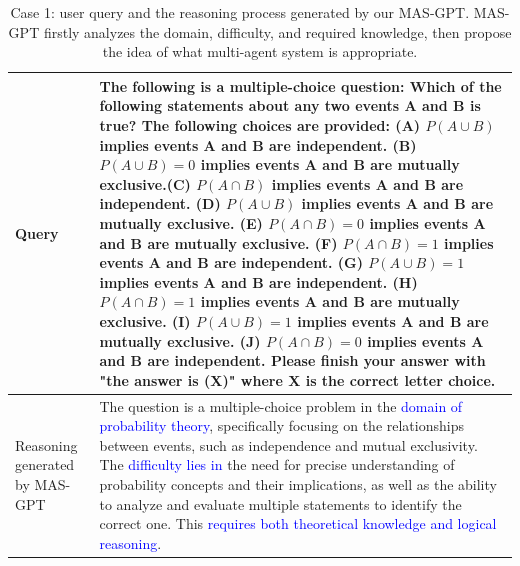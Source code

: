 \documentclass{article}
\theoremstyle{plain}
\theoremstyle{definition}
\theoremstyle{remark}
\begin{document}




\newpage
\appendix
\onecolumn

\begin{table}[t]
    \centering
    \caption{Case 1: user query and the reasoning process generated by our MAS-GPT. MAS-GPT firstly analyzes the domain, difficulty, and required knowledge, then propose the idea of what multi-agent system is appropriate.}
    \begin{tabular}{p{1.8cm}|p{14cm}}
    \toprule
        Query & The following is a multiple-choice question:
Which of the following statements about any two events A and B is true? \newline \newline The following choices are provided: \newline(A) $P(A \cup B)$ implies events A and B are independent. \newline
(B) $P(A \cup B) = 0$ implies events A and B are mutually exclusive.\newline(C) $P(A \cap B)$ implies events A and B are independent.\newline
(D) $P(A \cup B)$ implies events A and B are mutually exclusive.\newline
(E) $P(A \cap B) = 0$ implies events A and B are mutually exclusive.\newline
(F) $P(A \cap B) = 1$ implies events A and B are independent.\newline
(G) $P(A \cup B) = 1$ implies events A and B are independent.\newline
(H) $P(A \cap B) = 1$ implies events A and B are mutually exclusive.\newline
(I) $P(A \cup B) = 1$ implies events A and B are mutually exclusive.\newline
(J) $P(A \cap B) = 0$ implies events A and B are independent.\newline \newline
Please finish your answer with "the answer is (X)" where X is the correct letter choice. \\
    \midrule
        Reasoning generated by MAS-GPT & The question is a multiple-choice problem in the \textcolor{blue}{domain of probability theory}, specifically focusing on the relationships between events, such as independence and mutual exclusivity. The \textcolor{blue}{difficulty lies in} the need for precise understanding of probability concepts and their implications, as well as the ability to analyze and evaluate multiple statements to identify the correct one. This \textcolor{blue}{requires both theoretical knowledge and logical reasoning}. \newline \newline

\end{tabular}
\end{table}
\end{document}

